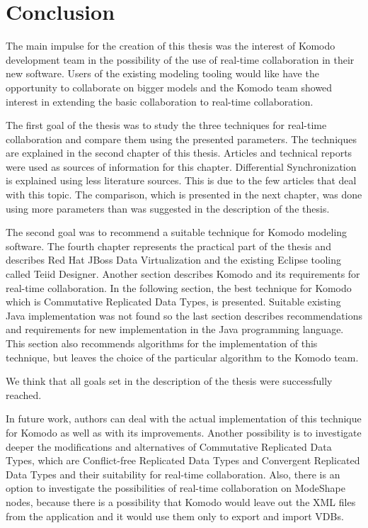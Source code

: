 \documentclass[12pt,oneside]{fithesis2}
\begin{document}
\chapter{Conclusion}
\par The main impulse for the creation of this thesis was the interest of Komodo development team in the possibility of the use of real-time collaboration in their new software. Users of the existing modeling tooling would like have the opportunity to collaborate on bigger models and the Komodo team showed interest in extending the basic collaboration to real-time collaboration.
\par The first goal of the thesis was to study the three techniques for real-time collaboration and compare them using the presented parameters. The techniques are explained in the second chapter of this thesis. Articles and technical reports were used as sources of information for this chapter. Differential Synchronization is explained using less literature sources. This is due to the few articles that deal with this topic. The comparison, which is presented in the next chapter, was done using more parameters than was suggested in the description of the thesis. 
\par The second goal was to recommend a suitable technique for Komodo modeling software. The fourth chapter represents the practical part of the thesis and describes Red Hat JBoss Data Virtualization and the existing Eclipse tooling called Teiid Designer. Another section describes Komodo and its requirements for real-time collaboration. In the following section, the best technique for Komodo which is Commutative Replicated Data Types, is presented. Suitable existing Java implementation was not found so the last section describes recommendations and requirements for new implementation in the Java programming language. This section also recommends algorithms for the implementation of this technique, but leaves the choice of the particular algorithm to the Komodo team.
\par We think that all goals set in the description of the thesis were successfully reached.
\par In future work, authors can deal with the actual implementation of this technique for Komodo as well as with its improvements. Another possibility is to investigate deeper the modifications and alternatives of Commutative Replicated Data Types, which are Conflict-free Replicated Data Types and Convergent Replicated Data Types and their suitability for real-time collaboration. Also, there is an option to investigate the possibilities of real-time collaboration on ModeShape nodes, because there is a possibility that Komodo would leave out the XML files from the application and it would use them only to export and import VDBs.
\printbibliography 
\end{document}
